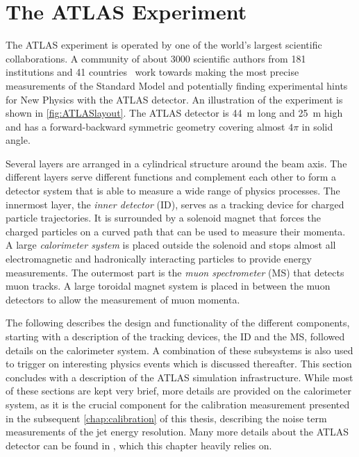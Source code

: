 \section{The ATLAS Experiment}

The ATLAS experiment is operated by one of the world's largest scientific collaborations. A community of about 3000 scientific authors from 181 institutions and 41 countries~\cite{AtlasCollab} work towards making the most precise measurements of the Standard Model and potentially finding experimental hints for New Physics with the ATLAS detector.
An illustration of the experiment is shown in \cref{fig:ATLASlayout}.
The ATLAS detector is \SI{44}{\meter} long and \SI{25}{\meter} high and has a forward-backward symmetric geometry covering almost $4\pi$ in solid angle.

Several layers are arranged in a cylindrical structure around the beam axis.
The different layers serve different functions and complement each other to form a detector system that is able to measure a wide range of physics processes.
The innermost layer, the \emph{inner detector} (ID), serves as a tracking device for charged particle trajectories. It is surrounded by a solenoid magnet that forces the charged particles on a curved path that can be used to measure their momenta.
A large \emph{calorimeter system} is placed outside the solenoid and stops almost all electromagnetic and hadronically interacting particles to provide energy measurements. The outermost part is the \emph{muon spectrometer} (MS) that detects muon tracks. A large toroidal magnet system is placed in between the muon detectors to allow the measurement of muon momenta.

The following describes the design and functionality of the different components, starting with a description of the tracking devices, the ID and the MS, followed details on the calorimeter system.
A combination of these subsystems is also used to trigger on interesting physics events which is discussed thereafter.
This section concludes with a description of the ATLAS simulation infrastructure. 
While most of these sections are kept very brief, more details are provided on the calorimeter system, as it is the crucial component for the calibration measurement presented in the subsequent \cref{chap:calibration} of this thesis, describing the noise term measurements of the jet energy resolution.
Many more details about the ATLAS detector can be found in , which this chapter heavily relies on.


